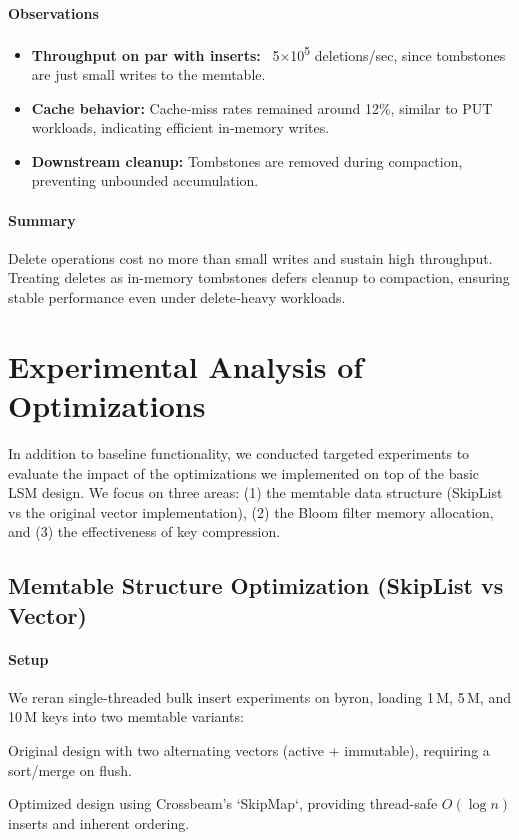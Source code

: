 \documentclass[10pt]{article}
\begin{document}
\paragraph{Observations}
\begin{itemize}[itemsep=0.5ex]
  \item \textbf{Throughput on par with inserts:} ~5×10\textsuperscript{5} deletions/sec, since tombstones are just small writes to the memtable.
  \item \textbf{Cache behavior:} Cache‐miss rates remained around 12\%, similar to PUT workloads, indicating efficient in‐memory writes.
  \item \textbf{Downstream cleanup:} Tombstones are removed during compaction, preventing unbounded accumulation.
\end{itemize}

\paragraph{Summary}
Delete operations cost no more than small writes and sustain high throughput. Treating deletes as in-memory tombstones defers cleanup to compaction, ensuring stable performance even under delete‐heavy workloads.

\section{Experimental Analysis of Optimizations}

In addition to baseline functionality, we conducted targeted experiments to evaluate the impact of the optimizations we implemented on top of the basic LSM design. We focus on three areas: (1) the memtable data structure (SkipList vs the original vector implementation), (2) the Bloom filter memory allocation, and (3) the effectiveness of key compression.

\subsection{Memtable Structure Optimization (SkipList vs Vector)}

\paragraph{Setup}
We reran single-threaded bulk insert experiments on byron, loading 1\,M, 5\,M, and 10\,M keys into two memtable variants:
\begin{description}[leftmargin=1em,labelwidth=*,itemsep=0.5ex]
  \item[Vec Double-Buffer] Original design with two alternating vectors (active + immutable), requiring a sort/merge on flush.
  \item[Lock-Free SkipList] Optimized design using Crossbeam’s `SkipMap`, providing thread-safe $O(\log n)$ inserts and inherent ordering.
\end{description}
\end{document}

